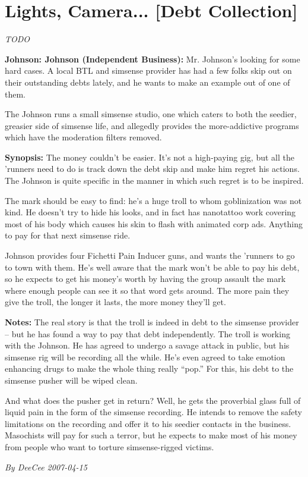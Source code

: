\documentclass[letterpaper,twocolumn,10.5pt]{article}
\newenvironment{scenario}[6]
	{
		\section{#1 {\small[#2]}}
		\textit{#3}
		\def\TMPSCENARIO{#4 #5}
	}
	{\small\textit{By \TMPSCENARIO}}
\newcommand{\johnson}[2]{\textbf{Johnson: #1 (#2):}}
\newcommand{\synopsis}{\textbf{Synopsis: }}
\newcommand{\notes}{\textbf{Notes: }}
\begin{document}
\begin{scenario}{Lights, Camera...}
	{Debt Collection}
	{TODO}
	{DeeCee}
	{2007-04-15}
	{https://forum.rpg.net/showthread.php?321504-Shadowrun-4th-101-Instant-Scenarios\&p=7173581#post7173581}

\johnson{Johnson}{Independent Business}  Mr. Johnson's looking for some hard cases. A local BTL and simsense provider has had a few folks skip out on their outstanding debts lately, and he wants to make an example out of one of them.

The Johnson runs a small simsense studio, one which caters to both the seedier, greasier side of simsense life, and allegedly provides the more-addictive programs which have the moderation filters removed.

\synopsis  The money couldn't be easier. It's not a high-paying gig, but all the 'runners need to do is track down the debt skip and make him regret his actions. The Johnson is quite specific in the manner in which such regret is to be inspired.

The mark should be easy to find: he's a huge troll to whom goblinization was not kind. He doesn't try to hide his looks, and in fact has nanotattoo work covering most of his body which causes his skin to flash with animated corp ads. Anything to pay for that next simsense ride.

Johnson provides four Fichetti Pain Inducer guns, and wants the 'runners to go to town with them. He's well aware that the mark won't be able to pay his debt, so he expects to get his money's worth by having the group assault the mark where enough people can see it so that word gets around. The more pain they give the troll, the longer it lasts, the more money they'll get.

\notes  The real story is that the troll is indeed in debt to the simsense provider – but he has found a way to pay that debt independently. The troll is working with the Johnson. He has agreed to undergo a savage attack in public, but his simsense rig will be recording all the while. He's even agreed to take emotion enhancing drugs to make the whole thing really ``pop.'' For this, his debt to the simsense pusher will be wiped clean.

And what does the pusher get in return? Well, he gets the proverbial glass full of liquid pain in the form of the simsense recording. He intends to remove the safety limitations on the recording and offer it to his seedier contacts in the business. Masochists will pay for such a terror, but he expects to make most of his money from people who want to torture simsense-rigged victims.


\end{scenario}
\end{document}

